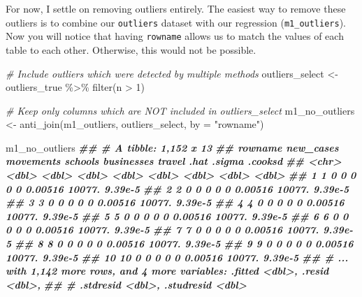 \documentclass[
]{book}
\newenvironment{Shaded}{\begin{snugshade}}{\end{snugshade}}
\newcommand{\AttributeTok}[1]{\textcolor[rgb]{0.77,0.63,0.00}{#1}}
\newcommand{\CommentTok}[1]{\textcolor[rgb]{0.56,0.35,0.01}{\textit{#1}}}
\newcommand{\DecValTok}[1]{\textcolor[rgb]{0.00,0.00,0.81}{#1}}
\newcommand{\DocumentationTok}[1]{\textcolor[rgb]{0.56,0.35,0.01}{\textbf{\textit{#1}}}}
\newcommand{\FunctionTok}[1]{\textcolor[rgb]{0.00,0.00,0.00}{#1}}
\newcommand{\NormalTok}[1]{#1}
\newcommand{\OtherTok}[1]{\textcolor[rgb]{0.56,0.35,0.01}{#1}}
\newcommand{\SpecialCharTok}[1]{\textcolor[rgb]{0.00,0.00,0.00}{#1}}
\newcommand{\StringTok}[1]{\textcolor[rgb]{0.31,0.60,0.02}{#1}}
\begin{document}
For now, I settle on removing outliers entirely. The easiest way to remove these outliers is to combine our \texttt{outliers} dataset with our regression (\texttt{m1\_outliers}). Now you will notice that having \texttt{rowname} allows us to match the values of each table to each other. Otherwise, this would not be possible.

\begin{Shaded}
\begin{Highlighting}[]
\CommentTok{\# Include outliers which were detected by multiple methods}
\NormalTok{outliers\_select }\OtherTok{\textless{}{-}}\NormalTok{ outliers\_true }\SpecialCharTok{\%\textgreater{}\%}
  \FunctionTok{filter}\NormalTok{(n }\SpecialCharTok{\textgreater{}} \DecValTok{1}\NormalTok{)}

\CommentTok{\# Keep only columns which are NOT included in outliers\_select}
\NormalTok{m1\_no\_outliers }\OtherTok{\textless{}{-}} \FunctionTok{anti\_join}\NormalTok{(m1\_outliers, outliers\_select, }\AttributeTok{by =} \StringTok{"rowname"}\NormalTok{)}

\NormalTok{m1\_no\_outliers}
\DocumentationTok{\#\# \# A tibble: 1,152 x 13}
\DocumentationTok{\#\#    rowname new\_cases movements schools businesses travel    .hat .sigma  .cooksd}
\DocumentationTok{\#\#    \textless{}chr\textgreater{}       \textless{}dbl\textgreater{}     \textless{}dbl\textgreater{}   \textless{}dbl\textgreater{}      \textless{}dbl\textgreater{}  \textless{}dbl\textgreater{}   \textless{}dbl\textgreater{}  \textless{}dbl\textgreater{}    \textless{}dbl\textgreater{}}
\DocumentationTok{\#\#  1 1               0         0       0          0      0 0.00516 10077.  9.39e{-}5}
\DocumentationTok{\#\#  2 2               0         0       0          0      0 0.00516 10077.  9.39e{-}5}
\DocumentationTok{\#\#  3 3               0         0       0          0      0 0.00516 10077.  9.39e{-}5}
\DocumentationTok{\#\#  4 4               0         0       0          0      0 0.00516 10077.  9.39e{-}5}
\DocumentationTok{\#\#  5 5               0         0       0          0      0 0.00516 10077.  9.39e{-}5}
\DocumentationTok{\#\#  6 6               0         0       0          0      0 0.00516 10077.  9.39e{-}5}
\DocumentationTok{\#\#  7 7               0         0       0          0      0 0.00516 10077.  9.39e{-}5}
\DocumentationTok{\#\#  8 8               0         0       0          0      0 0.00516 10077.  9.39e{-}5}
\DocumentationTok{\#\#  9 9               0         0       0          0      0 0.00516 10077.  9.39e{-}5}
\DocumentationTok{\#\# 10 10              0         0       0          0      0 0.00516 10077.  9.39e{-}5}
\DocumentationTok{\#\# \# ... with 1,142 more rows, and 4 more variables: .fitted \textless{}dbl\textgreater{}, .resid \textless{}dbl\textgreater{},}
\DocumentationTok{\#\# \#   .stdresid \textless{}dbl\textgreater{}, .studresid \textless{}dbl\textgreater{}}
\end{Highlighting}
\end{Shaded}
\end{document}
